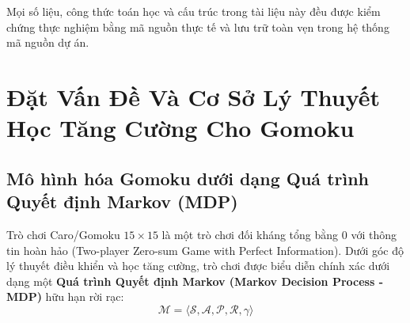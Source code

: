 \documentclass[11pt,a4paper]{report}
\begin{document}
Mọi số liệu, công thức toán học và cấu trúc trong tài liệu này đều được kiểm chứng thực nghiệm bằng mã nguồn thực tế và lưu trữ toàn vẹn trong hệ thống mã nguồn dự án.

\tableofcontents
\newpage
{}

\chapter{Đặt Vấn Đề Và Cơ Sở Lý Thuyết Học Tăng Cường Cho Gomoku}

\section{Mô hình hóa Gomoku dưới dạng Quá trình Quyết định Markov (MDP)}

Trò chơi Caro/Gomoku $15 \times 15$ là một trò chơi đối kháng tổng bằng 0 với thông tin hoàn hảo (Two-player Zero-sum Game with Perfect Information). Dưới góc độ lý thuyết điều khiển và học tăng cường, trò chơi được biểu diễn chính xác dưới dạng một \textbf{Quá trình Quyết định Markov (Markov Decision Process - MDP)} hữu hạn rời rạc:
\begin{equation}
    \mathcal{M} = \langle \mathcal{S}, \mathcal{A}, \mathcal{P}, \mathcal{R}, \gamma \rangle
\end{equation}
\end{document}
